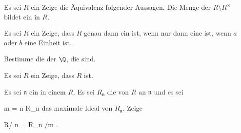 \setcounter{section}{15}







{}
{





Es sei $R$ ein
Zeige die Äquivalenz folgender Aussagen.
 {Die Menge der
$R \setminus R^\times$ bildet ein
in $R$.
}





}
{} {}

{}
{





Es sei $R$ ein
Zeige, dass $R$ genau dann ein
ist, wenn
 nur dann eine
ist, wenn $a$ oder $b$ eine Einheit ist.





}
{} {}

{}
{





Bestimme die
der
$\Q$, die
sind.





}
{} {}

{}
{





Es sei $R$ ein 
Zeige, dass $R$
ist.





}
{} {}

{}
{





Es sei ${\mathfrak n}$ ein
in einem
$R$. Es sei $R_{\mathfrak n}$ die
von $R$ an ${\mathfrak n}$ und es sei

\mavergleichskette
{\vergleichskette
{ {\mathfrak m}
}
{ = }{ {\mathfrak n} R_{\mathfrak n}
}
{  }{
}
{    }{
}
{   }{
}
}
{}{}{}
das maximale Ideal von $R_{\mathfrak n}$. Zeige

\mavergleichskette
{\vergleichskette
{ R/ {\mathfrak n}
}
{ = }{ R_{\mathfrak n} /{\mathfrak m}
}
{  }{
}
{    }{
}
{   }{
}
}
{}{}{.}





}
{} {}

